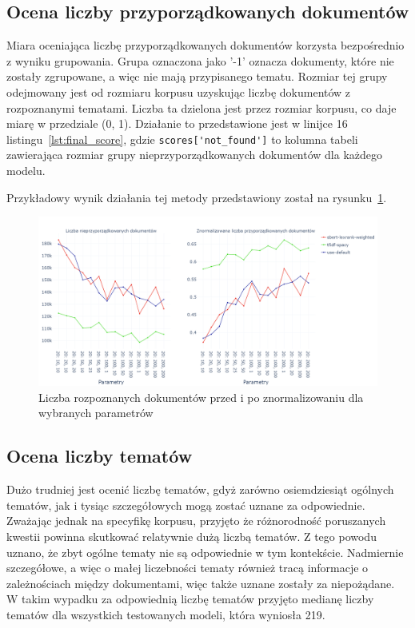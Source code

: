 	\subsection{Ocena liczby przyporządkowanych dokumentów}\label{sec:score_not_found}
		Miara oceniająca liczbę przyporządkowanych dokumentów korzysta bezpośrednio z wyniku grupowania.
		Grupa oznaczona jako '-1' oznacza dokumenty, które nie zostały zgrupowane, a więc nie mają przypisanego tematu.
		Rozmiar tej grupy odejmowany jest od rozmiaru korpusu uzyskując liczbę dokumentów z rozpoznanymi tematami.
		Liczba ta dzielona jest przez rozmiar korpusu, co daje miarę w przedziale (0, 1).
		Działanie to przedstawione jest w linijce 16 listingu~\ref{lst:final_score},
			gdzie \verb|scores['not_found']| to kolumna tabeli zawierająca rozmiar grupy nieprzyporządkowanych dokumentów dla każdego modelu.
		
		Przykładowy wynik działania tej metody przedstawiony został na rysunku~\ref{fig:not_found}.

		\begin{figure}[htb]
			\centering
			\includegraphics[width=\linewidth]{rys05/not_found.png}
			\caption{Liczba rozpoznanych dokumentów przed i po znormalizowaniu dla wybranych parametrów}\label{fig:not_found}
		\end{figure}

	\subsection{Ocena liczby tematów}\label{sec:score_topic_count}
		Dużo trudniej jest ocenić liczbę tematów, gdyż zarówno osiemdziesiąt ogólnych tematów,
			jak i tysiąc szczegółowych mogą zostać uznane za odpowiednie.
		Zważając jednak na specyfikę korpusu, przyjęto że różnorodność poruszanych kwestii powinna skutkować relatywnie dużą liczbą tematów.
		Z tego powodu uznano, że zbyt ogólne tematy nie są odpowiednie w tym kontekście.
		Nadmiernie szczegółowe, a więc o małej liczebności tematy również tracą informacje o zależnościach między dokumentami,
			więc także uznane zostały za niepożądane.
		W takim wypadku za odpowiednią liczbę tematów przyjęto medianę liczby tematów dla wszystkich testowanych modeli, która wyniosła 219.


